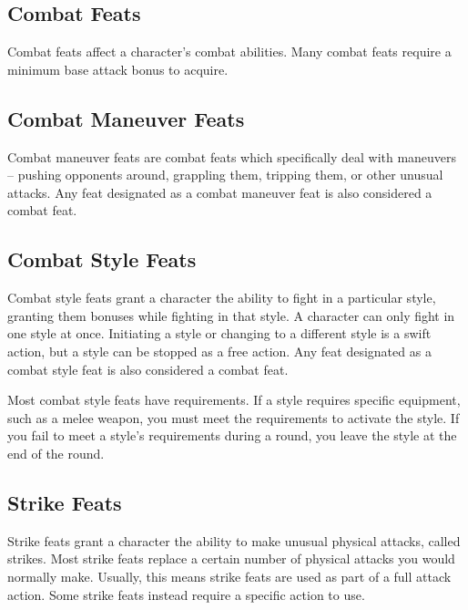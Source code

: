 
\subsection{Combat Feats}
Combat feats affect a character's combat abilities.
Many combat feats require a minimum base attack bonus to acquire.

\subsection{Combat Maneuver Feats}
Combat maneuver feats are combat feats which specifically deal with maneuvers -- pushing opponents around, grappling them, tripping them, or other unusual attacks.
Any feat designated as a combat maneuver feat is also considered a combat feat.

\subsection{Combat Style Feats}
Combat style feats grant a character the ability to fight in a particular style, granting them bonuses while fighting in that style.
A character can only fight in one style at once.
Initiating a style or changing to a different style is a swift action, but a style can be stopped as a free action.
Any feat designated as a combat style feat is also considered a combat feat.

Most combat style feats have requirements.
If a style requires specific equipment, such as a melee weapon, you must meet the requirements to activate the style.
If you fail to meet a style's requirements during a round, you leave the style at the end of the round.

\subsection{Strike Feats}\label{Strike Feats}
Strike feats grant a character the ability to make unusual physical attacks, called strikes.
Most strike feats replace a certain number of physical attacks you would normally make.
Usually, this means strike feats are used as part of a full attack action.
Some strike feats instead require a specific action to use.

